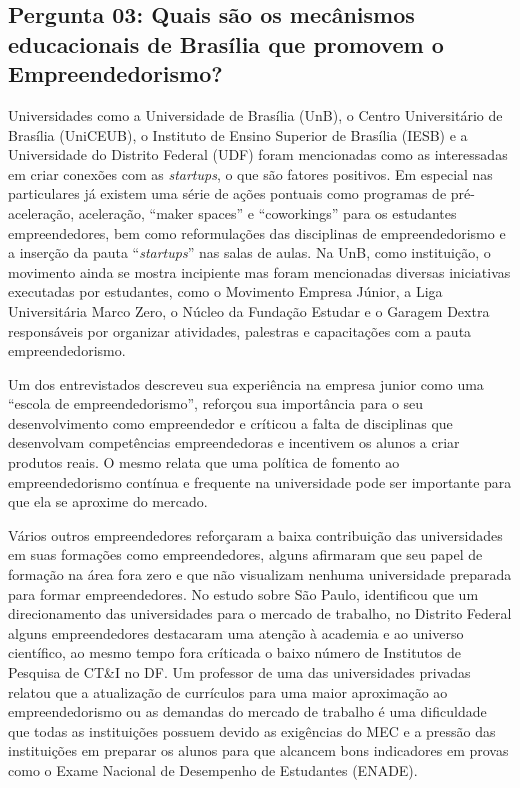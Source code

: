 \subsection*{Pergunta 03: Quais são os mecânismos educacionais de Brasília que promovem o Empreendedorismo?}
\label{subsection:pergunta_de_pesquisa_3}

Universidades como a Universidade de Brasília (UnB), o Centro Universitário de Brasília (UniCEUB), o Instituto de Ensino Superior de Brasília (IESB) e a Universidade do Distrito Federal (UDF) foram mencionadas como as  interessadas em criar conexões com as \textit{startups}, o que são fatores positivos. Em especial nas particulares já existem uma série de ações pontuais como programas de pré-aceleração, aceleração, ``maker spaces'' e ``coworkings'' para os estudantes empreendedores, bem como reformulações das disciplinas de empreendedorismo e a inserção da pauta ``\textit{startups}'' nas salas de aulas. Na UnB, como instituição, o movimento ainda se mostra incipiente mas foram mencionadas diversas iniciativas executadas por estudantes, como o Movimento Empresa Júnior, a Liga Universitária Marco Zero, o Núcleo da Fundação Estudar e o Garagem Dextra responsáveis por organizar atividades, palestras e capacitações com a pauta empreendedorismo. 

Um dos entrevistados descreveu sua experiência na empresa junior como uma ``escola de empreendedorismo'', reforçou sua importância para o seu desenvolvimento como empreendedor e críticou a falta de disciplinas que desenvolvam competências empreendedoras e incentivem os alunos a criar produtos reais. O mesmo relata que uma política de fomento ao empreendedorismo contínua e frequente na universidade pode ser importante para que ela se aproxime do mercado. 

Vários outros empreendedores reforçaram a baixa contribuição das universidades em suas formações como empreendedores, alguns afirmaram que seu papel de formação na área fora zero e que não visualizam nenhuma universidade preparada para formar empreendedores. No estudo sobre São Paulo,  identificou que um direcionamento das universidades para o mercado de trabalho, no Distrito Federal alguns empreendedores destacaram uma atenção à academia e ao universo científico, ao mesmo tempo fora críticada o baixo número de Institutos de Pesquisa de CT\&I no DF. Um professor de uma das universidades privadas relatou que a atualização de currículos para uma maior aproximação ao empreendedorismo ou as demandas do mercado de trabalho é uma dificuldade que todas as instituições possuem devido as exigências do MEC e a pressão das instituições em preparar os alunos para que alcancem bons indicadores em provas como o Exame Nacional de Desempenho de Estudantes (ENADE). 

